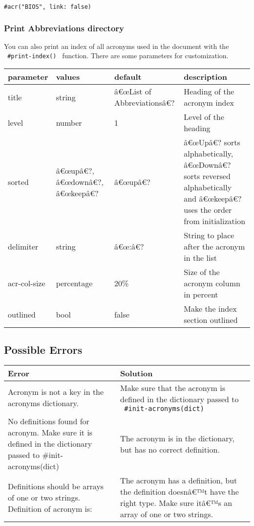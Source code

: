 \begin{verbatim}
#acr("BIOS", link: false)
\end{verbatim}

\subsubsection{Print Abbreviations
directory}\label{print-abbreviations-directory}

You can also print an index of all acronyms used in the document with
the \texttt{\ \#print-index()\ } function. There are some parameters for
customization.

\begin{longtable}[]{@{}llll@{}}
\toprule\noalign{}
parameter & values & default & description \\
\midrule\noalign{}
\endhead
\bottomrule\noalign{}
\endlastfoot
title & string & â€œList of Abbreviationsâ€? & Heading of the acronym
index \\
level & number & 1 & Level of the heading \\
sorted & â€œupâ€?, â€œdownâ€?, â€œkeepâ€? & â€œupâ€? & â€œUpâ€? sorts
alphabetically, â€œDownâ€? sorts reversed alphabetically and â€œkeepâ€?
uses the order from initialization \\
delimiter & string & â€œ:â€? & String to place after the acronym in the
list \\
acr-col-size & percentage & 20\% & Size of the acronym column in
percent \\
outlined & bool & false & Make the index section outlined \\
\end{longtable}

\subsection{Possible Errors}\label{possible-errors}

\begin{longtable}[]{@{}ll@{}}
\toprule\noalign{}
Error & Solution \\
\midrule\noalign{}
\endhead
\bottomrule\noalign{}
\endlastfoot
Acronym is not a key in the acronyms dictionary. & Make sure that the
acronym is defined in the dictionary passed to
\texttt{\ \#init-acronyms(dict)\ } \\
No definitions found for acronym. Make sure it is defined in the
dictionary passed to \#init-acronyms(dict) & The acronym is in the
dictionary, but has no correct definition. \\
Definitions should be arrays of one or two strings. Definition of
acronym is: & The acronym has a definition, but the definition doesnâ€™t
have the right type. Make sure itâ€™s an array of one or two strings. \\
\end{longtable}

